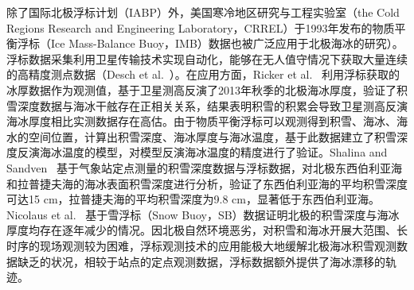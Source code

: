 除了国际北极浮标计划（IABP）外，美国寒冷地区研究与工程实验室（the Cold Regions Research and Engineering Laboratory，CRREL）于1993年发布的物质平衡浮标（Ice Mass-Balance Buoy，IMB）数据也被广泛应用于北极海冰的研究）。浮标数据采集利用卫星传输技术实现自动化，能够在无人值守情况下获取大量连续的高精度测点数据（Desch et al.~\cite{desch2017}）。在应用方面，Ricker et al.~\cite{ricker2014} 利用浮标获取的冰厚数据作为观测值，基于卫星测高反演了2013年秋季的北极海冰厚度，验证了积雪深度数据与海冰干舷存在正相关关系，结果表明积雪的积累会导致卫星测高反演海冰厚度相比实测数据存在高估。由于物质平衡浮标可以观测得到积雪、海冰、海水的空间位置，计算出积雪深度、海冰厚度与海冰温度，基于此数据建立了积雪深度反演海冰温度的模型，对模型反演海冰温度的精度进行了验证。Shalina and Sandven~\cite{shalina2018} 基于气象站定点测量的积雪深度数据与浮标数据，对北极东西伯利亚海和拉普捷夫海的海冰表面积雪深度进行分析，验证了东西伯利亚海的平均积雪深度可达15 cm，拉普捷夫海的平均积雪深度为9.8 cm，显著低于东西伯利亚海。Nicolaus et al.~\cite{nicolaus2018} 基于雪浮标（Snow Buoy，SB）数据证明北极的积雪深度与海冰厚度均存在逐年减少的情况。因北极自然环境恶劣，对积雪和海冰开展大范围、长时序的现场观测较为困难，浮标观测技术的应用能极大地缓解北极海冰积雪观测数据缺乏的状况，相较于站点的定点观测数据，浮标数据额外提供了海冰漂移的轨迹。

